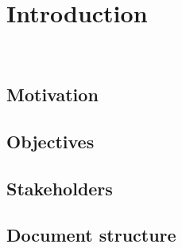 \chapter{Introduction}
\
\section{Motivation}

\section{Objectives}

\section{Stakeholders}

\section{Document structure}